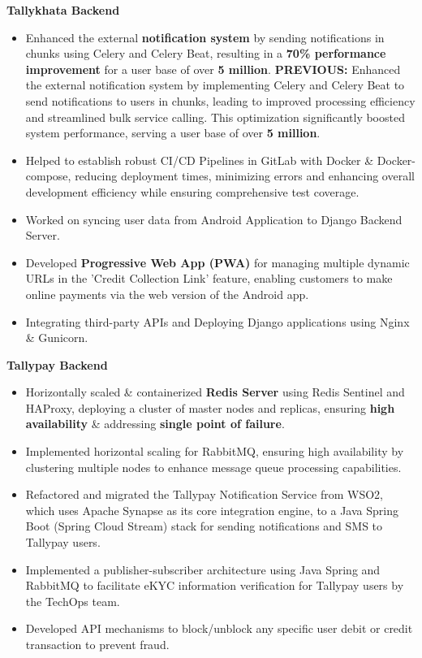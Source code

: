 \documentclass[10pt,a4paper,ragged2e,withhyper]{altacv}
\begin{document}
\textbf{Tallykhata Backend}
\begin{itemize}
\item Enhanced the external \textbf{notification system} by sending notifications in chunks using Celery and Celery Beat, resulting in a \textbf{70\% performance improvement} for a user base of over \textbf{5 million}.
\textbf{PREVIOUS:} Enhanced the external notification system by implementing Celery and Celery Beat to send notifications to users in chunks, leading to improved processing efficiency and streamlined bulk service calling. This optimization significantly boosted system performance, serving a user base of over \textbf{5 million}.
\item Helped to establish robust CI/CD Pipelines in GitLab with Docker \& Docker-compose, reducing deployment times, minimizing errors and enhancing overall development efficiency while ensuring comprehensive test coverage.
\item Worked on syncing user data from Android Application to Django Backend Server.
\item Developed \textbf{Progressive Web App (PWA)} for managing multiple dynamic URLs in the 'Credit Collection Link' feature, enabling customers to make online payments via the web version of the Android app.
\item Integrating third-party APIs and Deploying Django applications using Nginx \& Gunicorn.
\end{itemize}
\textbf{Tallypay Backend}
\begin{itemize}
\item Horizontally scaled \& containerized \textbf{Redis Server} using Redis Sentinel and HAProxy, deploying a cluster of master nodes and replicas, ensuring \textbf{high availability} \& addressing \textbf{single point of failure}.
\item Implemented horizontal scaling for RabbitMQ, ensuring high availability by clustering multiple nodes to enhance
message queue processing capabilities.
\item Refactored and migrated the Tallypay Notification Service from WSO2, which uses Apache Synapse as its core integration engine, to a Java Spring Boot (Spring Cloud Stream) stack for sending notifications and SMS to Tallypay users.
\item Implemented a publisher-subscriber architecture using Java Spring and RabbitMQ to facilitate eKYC information verification for Tallypay users by the TechOps team.
\item Developed API mechanisms to block/unblock any specific user debit or credit transaction to prevent fraud.
\end{itemize}
\end{document}
